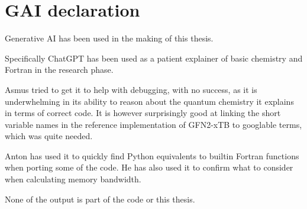 \chapter{GAI declaration}
Generative AI has been used in the making of this thesis.

Specifically ChatGPT has been used as a patient explainer of basic chemistry and Fortran in the research phase.

Asmus tried to get it to help with debugging, with no success, as it is underwhelming in its ability to reason about the quantum chemistry it explains in terms of correct code. 
It is however surprisingly good at linking the short variable names in the reference implementation of GFN2-xTB to googlable terms, which was quite needed.

Anton has used it to quickly find Python equivalents to builtin Fortran functions when porting some of the code. He has also used it to confirm what to consider when calculating memory bandwidth.

None of the output is part of the code or this thesis. 



